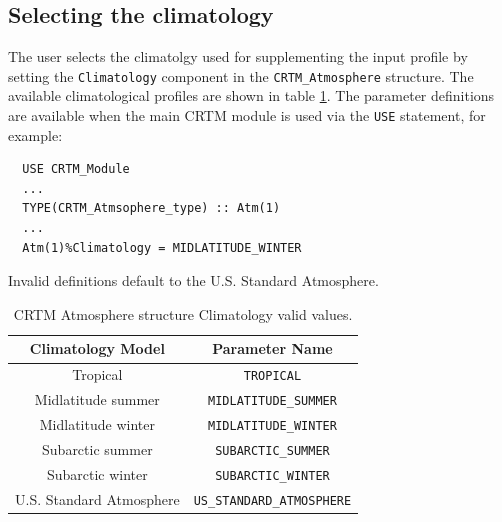 \subsection{Selecting the climatology}
The user selects the climatolgy used for supplementing the input profile by setting the \texttt{Climatology} component in the \texttt{CRTM\_Atmosphere} structure. The available climatological profiles are shown in table \ref{tab:climatology}. The parameter definitions are available when the main CRTM module is used via the \texttt{USE} statement, for example:
\begin{verbatim}
  USE CRTM_Module
  ...
  TYPE(CRTM_Atmsophere_type) :: Atm(1)
  ...
  Atm(1)%Climatology = MIDLATITUDE_WINTER
\end{verbatim}
Invalid definitions default to the U.S. Standard Atmosphere.
\begin{table}[htp]
  \centering
  \begin{tabular}{c | c}
    Climatology Model & Parameter Name\\
    \hline
    Tropical                 & \texttt{TROPICAL}\\
    Midlatitude summer       & \texttt{MIDLATITUDE\_SUMMER}\\
    Midlatitude winter       & \texttt{MIDLATITUDE\_WINTER}\\
    Subarctic summer         & \texttt{SUBARCTIC\_SUMMER}\\
    Subarctic winter         & \texttt{SUBARCTIC\_WINTER}\\
    U.S. Standard Atmosphere & \texttt{US\_STANDARD\_ATMOSPHERE}
  \end{tabular}
  \caption{CRTM Atmosphere structure Climatology valid values.}
  \label{tab:climatology}
\end{table}


